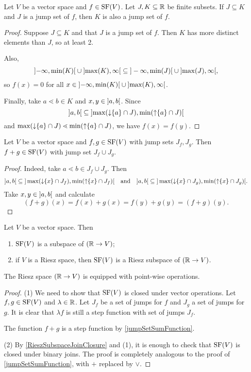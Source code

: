 \begin{lemma} \label{supersetJumpSet}
Let $V$ be a vector space and $f\in \operatorname{SF}(V)$. Let $J,K \subseteq \mathbb{R}$ be finite subsets. If $J\subseteq K$ and $J$ is a jump set of $f$, then $K$ is also a jump set of $f$.
\end{lemma}
\begin{proof}
Suppose $J\subseteq K$ and that $J$ is a jump set of $f$. Then $K$ has more distinct elements than $J$, so at least 2.

Also,
\[ \interval[o]{-\infty,\min(K)} \cup \interval[o]{\max(K), \infty} \subseteq \interval[o]{\big.-\infty,\min(J)} \cup \interval[o]{\max(J), \infty}, \]
so $f(x) = 0$ for all $x\in \interval[o]{-\infty,\min(K)} \cup \interval[o]{\max(K), \infty}$.

Finally, take $a\lessdot b\in K$ and $x, y\in \interval[o]{a,b}$. Since
\[ \interval[o]{a,b} \subseteq \interval[o]{\max(\downset\{a\}\cap J), \min(\upset\{a\}\cap J)} \]
and $\max(\operatorname{\downarrow}\{a\}\cap J) \lessdot \min(\operatorname{\uparrow}\{a\}\cap J)$, we have $f(x) = f(y)$.
\end{proof}


\begin{lemma} \label{jumpSetSumFunction}
Let $V$ be a vector space and $f,g \in \operatorname{SF}(V)$ with jump sets $J_f, J_g$. Then $f+g\in \operatorname{SF}(V)$ with jump set $J_f\cup J_g$.
\end{lemma}
\begin{proof}
Indeed, take $a \lessdot b \in J_f \cup J_g$. Then
\[ \interval[o]{a,b} \subseteq \interval[o]{\big.\max(\downset\{x\}\cap J_f), \min(\upset\{x\}\cap J_f)} \quad\text{and}\quad \interval[o]{a,b} \subseteq \interval[o]{\big.\max(\downset\{x\}\cap J_g), \min(\upset\{x\}\cap J_g)}. \]
Take $x,y\in \interval[o]{a,b}$ and calculate
\[ (f+g)(x) = f(x) + g(x) = f(y) + g(y) = (f+g)(y). \]
\end{proof}


\begin{proposition}
Let $V$ be a vector space. Then
\begin{enumerate}
\item $\operatorname{SF}(V)$ is a subspace of $(\mathbb{R}\to V)$;
\item if $V$ is a Riesz space, then $\operatorname{SF}(V)$ is a Riesz subspace of $(\mathbb{R}\to V)$.
\end{enumerate}
\end{proposition}
The Riesz space $(\mathbb{R}\to V)$ is equipped with point-wise operations.
\begin{proof}
(1) We need to show that $\operatorname{SF}(V)$ is closed under vector operations. Let $f,g \in \operatorname{SF}(V)$ and $\lambda\in \mathbb{R}$. Let $J_f$ be a set of jumps for $f$ and $J_g$ a set of jumps for $g$. It is clear that $\lambda f$ is still a step function with set of jumps $J_f$.

The function $f+g$ is a step function by \ref{jumpSetSumFunction}.

(2) By \ref{RieszSubspaceJoinClosure} and (1), it is enough to check that $\operatorname{SF}(V)$ is closed under binary joins. The proof is completely analogous to the proof of \ref{jumpSetSumFunction}, with $+$ replaced by $\vee$.
\end{proof}

